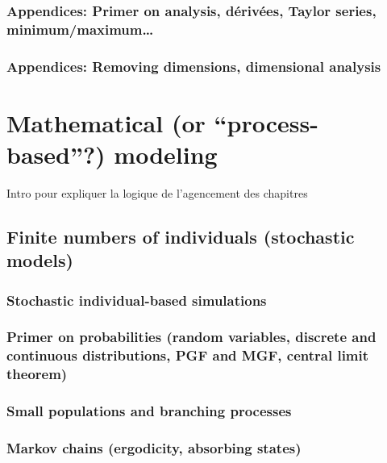 \documentclass[
]{book}
\theoremstyle{definition}
\theoremstyle{definition}
\theoremstyle{definition}
\theoremstyle{definition}
\theoremstyle{remark}
\begin{document}
\subsection{Appendices: Primer on analysis, dérivées, Taylor series, minimum/maximum\ldots{}}\label{appendices-primer-on-analysis-duxe9rivuxe9es-taylor-series-minimummaximum}

\subsection{Appendices: Removing dimensions, dimensional analysis}\label{appendices-removing-dimensions-dimensional-analysis}

\chapter{Mathematical (or ``process-based''?) modeling}\label{mathematical-or-process-based-modeling}

Intro pour expliquer la logique de l'agencement des chapitres

\section{Finite numbers of individuals (stochastic models)}\label{finite-numbers-of-individuals-stochastic-models}

\subsection{Stochastic individual-based simulations}\label{stochastic-individual-based-simulations}

\subsection{Primer on probabilities (random variables, discrete and continuous distributions, PGF and MGF, central limit theorem)}\label{primer-on-probabilities-random-variables-discrete-and-continuous-distributions-pgf-and-mgf-central-limit-theorem}

\subsection{Small populations and branching processes}\label{small-populations-and-branching-processes}

\subsection{Markov chains (ergodicity, absorbing states)}\label{markov-chains-ergodicity-absorbing-states}
\end{document}
